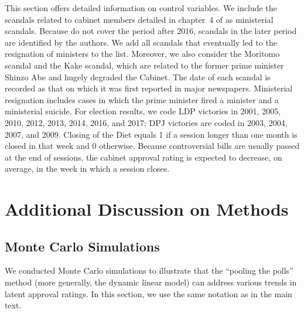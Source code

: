 \documentclass[12pt,letterpaper]{scrartcl}
\begin{document}
This section offers detailed information on control variables. We include the scandals related to cabinet members detailed in chapter~4 of \citet{Carlson2018} as ministerial scandals. Because \citet{Carlson2018} do not cover the period after 2016, scandals in the later period are identified by the authors. We add all scandals that eventually led to the resignation of ministers to the list. Moreover, we also consider the Moritomo scandal and the Kake scandal, which are related to the former prime minister Shinzo Abe and hugely degraded the Cabinet. The date of each scandal is recorded as that on which it was first reported in major newspapers. Ministerial resignation includes cases in which the prime minister fired a minister and a ministerial suicide. For election results, we code LDP victories in 2001, 2005, 2010, 2012, 2013, 2014, 2016, and 2017; DPJ victories are coded in 2003, 2004, 2007, and 2009. Closing of the Diet equals 1 if a session longer than one month is closed in that week and 0 otherwise. Because controversial bills are usually passed at the end of sessions, the cabinet approval rating is expected to decrease, on average, in the week in which a session closes.

\section{Additional Discussion on Methods}\label{app:sec:methods}

\subsection{Monte Carlo Simulations}\label{app:subsec:simulation}

We conducted Monte Carlo simulations to illustrate that the ``pooling the polls'' method (more generally, the dynamic linear model) can address various trends in latent approval ratings. In this section, we use the same notation as in the main text.
\end{document}
